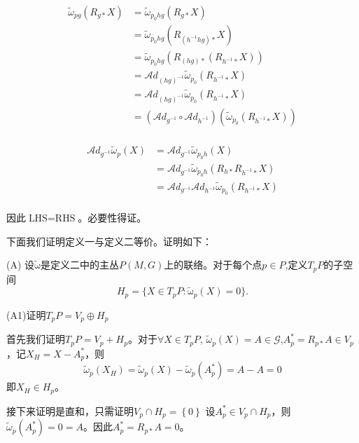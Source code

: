 \documentclass{ctexbook}
\begin{document}
\begin{equation}
    \begin{split}
        \tilde{\mathscr{\omega}}_{pg}(R_{g*}X)
        &=\tilde{\mathscr{\omega}}_{p_0h g}(R_{g*}X)\\
        &=\tilde{\mathscr{\omega}}_{p_0h g}(R_{\left(h^{-1}h g\right)*}X)\\
        &=\tilde{\mathscr{\omega}}_{p_0h g}\left(R_{\left(h g\right)*}\left(R_{h^{-1}*}X\right)\right)\\
        &=\mathscr{A}d_{(h g)^{-1}} \tilde{\mathscr{\omega}}_{p_0}\left(R_{h^{-1}*}X\right)\\         
        &=\mathscr{A}d_{(h g)^{-1}} \tilde{\mathscr{\omega}}_{p_0}\left(R_{h^{-1}*}X\right)\\
        &=\left(\mathscr{A}d_{g^{-1}}\circ\mathscr{A}d_{h^{-1}}\right) \left(\tilde{\mathscr{\omega}}_{p_0}\left(R_{h^{-1}*}X\right)\right)\\
    \end{split}
\end{equation}

\begin{equation}
    \begin{split}
        \mathscr{A}d_{g^{-1}}\tilde{\mathscr{\omega}}_{p}(X)
        &=\mathscr{A}d_{g^{-1}}\tilde{\mathscr{\omega}}_{p_0 h}(X)\\
        &=\mathscr{A}d_{g^{-1}}\tilde{\mathscr{\omega}}_{p_0 h}(R_{h*}R_{h^{-1}*}X)\\
        &=\mathscr{A}d_{g^{-1}}\mathscr{A}d_{h^{-1}}\tilde{\mathscr{\omega}}_{p_0}(R_{h^{-1}*}X)\\
    \end{split}
\end{equation}

因此$\text{LHS}=\text{RHS}$。必要性得证。

下面我们证明定义一与定义二等价。证明如下：

(A) 设$\tilde{\mathrm{\omega}}$是定义二中的主丛$P(M,G)$上的联络。对于每个点$p\in P$,定义$T_p P$的子空间 \[H_{p}=\{X\in T_p P\colon \tilde{\mathrm{\omega}}_p(X)=0\}.\]

(A1)证明$T_p P=V_p\oplus H_p$

首先我们证明$T_p P=V_p+H_p$。对于$\forall X\in T_p P$, $\tilde{\mathscr{\omega}}_p(X)=A\in\mathscr{G}$,$A_p^{*}=R_{p*}A\in V_p$，记$X_H=X-A_p^{*}$，则
\[\tilde{\mathscr{\omega}}_p(X_H)=\tilde{\mathscr{\omega}}_p(X)-\tilde{\mathscr{\omega}}_p(A_p^{*})=A-A=0\]
即$X_H\in H_p$。

接下来证明是直和，只需证明$V_p\cap H_p=\left\{0\right\}$
设$A_p^{*}\in V_p\cap H_p$，则 $\tilde{\mathscr{\omega}}_p(A_p^*)=0=A$。因此$A_{p}^{*}=R_{p*}A=0$。
\end{document}

